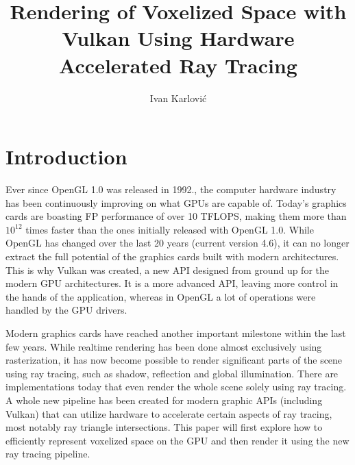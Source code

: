 \documentclass[times, utf8, zavrsni, numeric]{fer}
\begin{document}

\title{Rendering of Voxelized Space with Vulkan Using Hardware Accelerated Ray Tracing}

\author{Ivan Karlović}

\maketitle

\izvornik

\zahvala{}

\tableofcontents

\chapter{Introduction}

Ever since OpenGL 1.0 was released in 1992., the computer hardware industry has been continuously improving on what GPUs are capable of. Today's graphics cards are boasting FP performance of over 10 TFLOPS, making them more than $10^{12}$ times faster than the ones initially released with OpenGL 1.0. While OpenGL has changed over the last 20 years (current version 4.6), it can no longer extract the full potential of the graphics cards built with modern architectures. This is why Vulkan was created, a new API designed from ground up for the modern GPU architectures. It is a more advanced API, leaving more control in the hands of the application, whereas in OpenGL a lot of operations were handled by the GPU drivers.

Modern graphics cards have reached another important milestone within the last few years. While realtime rendering has been done almost exclusively using rasterization, it has now become possible to render significant parts of the scene using ray tracing, such as shadow, reflection and global illumination. There are implementations today that even render the whole scene solely using ray tracing. A whole new pipeline has been created for modern graphic APIs (including Vulkan) that can utilize hardware to accelerate certain aspects of ray tracing, most notably ray triangle intersections. This paper will first explore how to efficiently represent voxelized space on the GPU and then render it using the new ray tracing pipeline.
\end{document}
